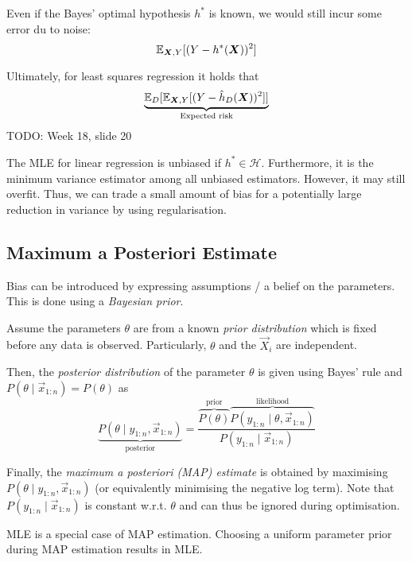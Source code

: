 Even if the Bayes' optimal hypothesis $h^*$ is
known, we would still incur some error du to noise:
\begin{equation*}
    \mathbb{E}_{\boldsymbol{X}, Y}[
        (Y - h^*(\boldsymbol{X}))^2
    ]
\end{equation*}

Ultimately, for least squares regression it holds that
\begin{align*}
    \underbrace{\mathbb{E}_D[\mathbb{E}_{\boldsymbol{X}, Y}[
        (Y - \hat{h}_D(\boldsymbol{X}))^2
    ]]}_{\text{Expected risk}}
\end{align*}
TODO: Week 18, slide 20

The MLE for linear regression is unbiased
if $h^* \in \mathcal{H}$.
Furthermore, it is the minimum variance
estimator among all unbiased estimators.
However, it may still overfit.
Thus, we can trade a small amount of bias
for a potentially large reduction in variance
by using regularisation.


\subsection{Maximum a Posteriori Estimate}
Bias can be introduced by expressing assumptions / a belief
on the parameters.
This is done using a \emph{Bayesian prior}.

Assume the parameters $\theta$ are from a known
\emph{prior distribution} which is fixed before any data
is observed.
Particularly, $\theta$ and the $\vec{X}_i$ are independent.

Then, the \emph{posterior distribution} of the parameter
$\theta$ is given using Bayes' rule
and $P(\theta \mid \vec{x}_{1:n}) = P(\theta)$ as
\begin{equation*}
    \underbrace{
        P(\theta \mid y_{1:n}, \vec{x}_{1:n})}_\text{posterior}
    = \frac{
        \overbrace{P(\theta)}^\text{prior}
        \overbrace{
        P(y_{1:n} \mid \theta, \vec{x}_{1:n})}^\text{likelihood}
    }{
        P(y_{1:n} \mid \vec{x}_{1:n})
    }
\end{equation*}

Finally, the \emph{maximum a posteriori (MAP) estimate}
is obtained by maximising $P(\theta \mid y_{1:n}, \vec{x}_{1:n})$
(or equivalently minimising the negative log term).
Note that $P(y_{1:n} \mid \vec{x}_{1:n})$ is constant w.r.t.
$\theta$ and can thus be ignored during optimisation.

MLE is a special case of MAP estimation.
Choosing a uniform parameter prior during
MAP estimation results in MLE.


